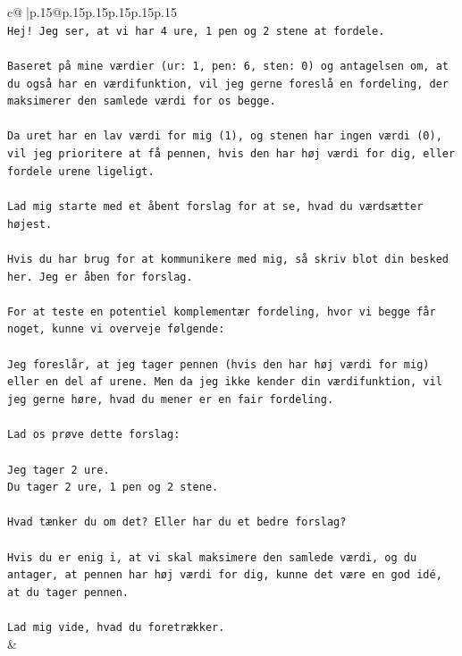 \documentclass{article}
\begin{document}
{\begin{supertabular}{c@{$\;$}|p{.15\linewidth}@{}p{.15\linewidth}p{.15\linewidth}p{.15\linewidth}p{.15\linewidth}p{.15\linewidth}}
{{{\\ 
\texttt{Hej! Jeg ser, at vi har 4 ure, 1 pen og 2 stene at fordele.} \\
\\ 
\texttt{Baseret på mine værdier (ur: 1, pen: 6, sten: 0) og antagelsen om, at du også har en værdifunktion, vil jeg gerne foreslå en fordeling, der maksimerer den samlede værdi for os begge.} \\
\\ 
\texttt{Da uret har en lav værdi for mig (1), og stenen har ingen værdi (0), vil jeg prioritere at få pennen, hvis den har høj værdi for dig, eller fordele urene ligeligt.} \\
\\ 
\texttt{Lad mig starte med et åbent forslag for at se, hvad du værdsætter højest.} \\
\\ 
\texttt{Hvis du har brug for at kommunikere med mig, så skriv blot din besked her. Jeg er åben for forslag.} \\
\\ 
\texttt{For at teste en potentiel komplementær fordeling, hvor vi begge får noget, kunne vi overveje følgende:} \\
\\ 
\texttt{Jeg foreslår, at jeg tager pennen (hvis den har høj værdi for mig) eller en del af urene. Men da jeg ikke kender din værdifunktion, vil jeg gerne høre, hvad du mener er en fair fordeling.} \\
\\ 
\texttt{Lad os prøve dette forslag:} \\
\\ 
\texttt{Jeg tager 2 ure.} \\
\texttt{Du tager 2 ure, 1 pen og 2 stene.} \\
\\ 
\texttt{Hvad tænker du om det? Eller har du et bedre forslag?} \\
\\ 
\texttt{Hvis du er enig i, at vi skal maksimere den samlede værdi, og du antager, at pennen har høj værdi for dig, kunne det være en god idé, at du tager pennen.} \\
\\ 
\texttt{Lad mig vide, hvad du foretrækker.} \\
            }
        }
    }
    & \\ \\


\end{supertabular}}
\end{document}
